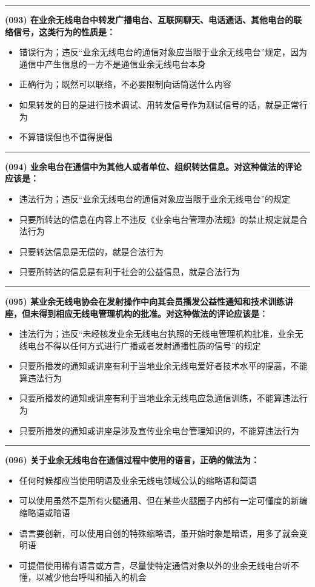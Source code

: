 \documentclass[twocolumn]{ctexart}  %
\begin{document}
\noindent\rule{0.5\textwidth}{1pt}
\heiti \textbf{(093) 在业余无线电台中转发广播电台、互联网聊天、电话通话、其他电台的联络信号，这类行为的性质是：} \songti {\color{gray} [LK0057] }
\begin{itemize}
	\item  错误行为；违反“业余无线电台的通信对象应当限于业余无线电台”规定，因为通信中产生信息的一方不是通信业余无线电台本身
	\item  正确行为；既然可以联络，不必要限制向话筒送什么内容
	\item  如果转发的目的是进行技术调试、用转发信号作为测试信号的话，就是正常行为
	\item  不算错误但也不值得提倡
\end{itemize}


\noindent\rule{0.5\textwidth}{1pt}
\heiti \textbf{(094) 业余电台在通信中为其他人或者单位、组织转达信息。对这种做法的评论应该是：} \songti {\color{gray} [LK0058] }
\begin{itemize}
	\item  违法行为；违反“业余无线电台的通信对象应当限于业余无线电台”的规定
	\item  只要所转达的信息在内容上不违反《业余电台管理办法规》的禁止规定就是合法行为
	\item  只要转达信息是无偿的，就是合法行为
	\item  只要所转达的信息是有利于社会的公益信息，就是合法行为
\end{itemize}


\noindent\rule{0.5\textwidth}{1pt}
\heiti \textbf{(095) 某业余无线电协会在发射操作中向其会员播发公益性通知和技术训练讲座，但未得到相应无线电管理机构的批准。对这种做法的评论应该是：} \songti {\color{gray} [LK0059] }
\begin{itemize}
	\item  违法行为；违反“未经核发业余无线电台执照的无线电管理机构批准，业余无线电台不得以任何方式进行广播或者发射通播性质的信号”的规定
	\item  只要所播发的通知或讲座有利于当地业余无线电爱好者技术水平的提高，不能算违法行为
	\item  只要所播发的通知或讲座有利于当地业余无线电应急通信训练，不能算违法行为
	\item  只要所播发的通知或讲座是涉及宣传业余电台管理知识的，不能算违法行为
\end{itemize}


\noindent\rule{0.5\textwidth}{1pt}
\heiti \textbf{(096) 关于业余无线电台在通信过程中使用的语言，正确的做法为：} \songti {\color{gray} [LK0060] }
\begin{itemize}
	\item  任何时候都应当使用明语及业余无线电领域公认的缩略语和简语
	\item  可以使用虽然不是所有火腿通用、但在某些火腿圈子内部有一定可懂度的新编缩略语或暗语
	\item  语言要创新，可以使用自创的特殊缩略语，虽开始时象是暗语，用多了就会变明语
	\item  可提倡使用稀有语言或方言，尽量使特定通信对象以外的业余无线电台听不懂，以减少他台呼叫和插入的机会
\end{itemize}
\end{document}

